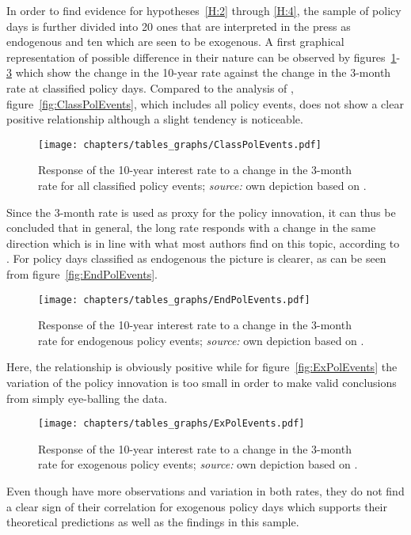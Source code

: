 In order to find evidence for hypotheses~\ref{H:2} through \ref{H:4}, the sample of policy days is further divided into 20 ones that are interpreted in the press as endogenous and ten which are seen to be exogenous. A first graphical representation of possible difference in their nature can be observed by figures~\ref{fig:ClassPolEvents}-\ref{fig:ExPolEvents} which show the change in the 10-year rate against the change in the 3-month rate at classified policy days. Compared to the analysis of \textcite{Ellingsen.2003}, figure~\vref{fig:ClassPolEvents}, which includes all policy events, does not show a clear positive relationship although a slight tendency is noticeable. 
\begin{figure}[htbp]
	\centering
	\texttt{[image: chapters/tables\_graphs/ClassPolEvents.pdf]} 
	\caption[Response of the 10-year interest rate to a change in the 3-month rate for all classified policy events.]{Response of the 10-year interest rate to a change in the 3-month rate for all classified policy events; \textit{source:} own depiction based on \textcite{Ellingsen.2003}.}
	\label{fig:ClassPolEvents}
\end{figure}
%
Since the 3-month rate is used as proxy for the policy innovation, it can thus be concluded that in general, the long rate responds with a change in the same direction which is in line with what most authors find on this topic, according to \textcite{Ellingsen.2003}. For policy days classified as endogenous the picture is clearer, as can be seen from figure~\vref{fig:EndPolEvents}.
\begin{figure}[htbp]
	\centering
	\texttt{[image: chapters/tables\_graphs/EndPolEvents.pdf]} 
	\caption[Response of the 10-year interest rate to a change in the 3-month rate for endogenous policy events.]{Response of the 10-year interest rate to a change in the 3-month rate for endogenous policy events; \textit{source:} own depiction based on \textcite{Ellingsen.2003}.}
	\label{fig:EndPolEvents}
\end{figure}
%
Here, the relationship is obviously positive while for figure~\vref{fig:ExPolEvents} the variation of the policy innovation is too small in order to make valid conclusions from simply eye-balling the data.
\begin{figure}[htbp]
	\centering
	\texttt{[image: chapters/tables\_graphs/ExPolEvents.pdf]} 
	\caption[Response of the 10-year interest rate to a change in the 3-month rate for exogenous policy events]{Response of the 10-year interest rate to a change in the 3-month rate for exogenous policy events; \textit{source:} own depiction based on \textcite{Ellingsen.2003}.}
	\label{fig:ExPolEvents}
\end{figure}
%
Even though \textcite{Ellingsen.2003} have more observations and variation in both rates, they do not find a clear sign of their correlation for exogenous policy days which supports their theoretical predictions as well as the findings in this sample. 

